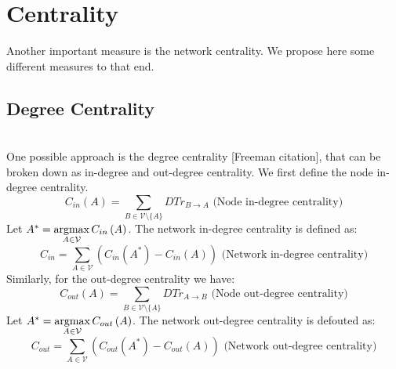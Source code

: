 \section{Centrality}
  Another important measure is the network centrality. We propose here some different measures to that end.
  
  \subsection{Degree Centrality} \ \\

    One possible approach is the degree centrality [Freeman citation], that can be broken down as in-degree and out-degree
    centrality. We first define the node in-degree centrality.
    \begin{equation*}
      C_{in}\left(A\right) = \sum\limits_{B \in \mathcal{V} \setminus \{A\}}DTr_{B \rightarrow A} \mbox{ (Node in-degree
      centrality)}
    \end{equation*}
    Let $A^* = \operatorname*{argmax}\limits_{A \in \mathcal{V}}C_{in}\left(A\right)$. The network in-degree centrality is defined as:
    \begin{equation*}
      C_{in} = \sum\limits_{A \in \mathcal{V}}\left(C_{in}\left(A^*\right) - C_{in}\left(A\right)\right) \mbox{ (Network
      in-degree centrality)}
    \end{equation*}
    Similarly, for the out-degree centrality we have:
    \begin{equation*}
      C_{out}\left(A\right) = \sum\limits_{B \in \mathcal{V} \setminus \{A\}}DTr_{A \rightarrow B} \mbox{ (Node out-degree
      centrality)}
    \end{equation*}
    Let $A^* = \operatorname*{argmax}\limits_{A \in \mathcal{V}}C_{out}\left(A\right)$. The network out-degree centrality is defouted as:
    \begin{equation*}
      C_{out} = \sum\limits_{A \in \mathcal{V}}\left(C_{out}\left(A^*\right) - C_{out}\left(A\right)\right) \mbox{ (Network
      out-degree centrality)}
    \end{equation*}
